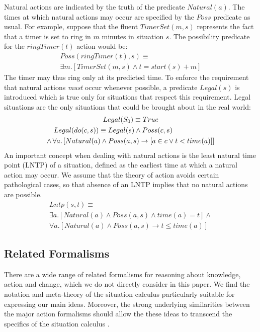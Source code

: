 Natural actions are indicated by the truth of the predicate $Natural(a)$.
The times at which natural actions may occur are specified by the
$Poss$ predicate as usual. For example, suppose that the fluent $TimerSet(m,s)$
represents the fact that a timer is set to ring in $m$ minutes in
situation $s$. The possibility predicate for the $ringTimer(t)$
action would be:\begin{multline*}
Poss(ringTimer(t),s)\equiv\\
\exists m.\left[TimerSet(m,s)\wedge t=start(s)+m\right]\end{multline*}
 The timer may thus ring only at its predicted time. To enforce the
requirement that natural actions \emph{must} occur whenever possible,
a predicate $Legal(s)$ is introduced which is true only for situations
that respect this requirement. Legal situations are the only situations
that could be brought about in the real world:\begin{multline*}
Legal(S_{0})\equiv True\\
\shoveleft{Legal(do(c,s))\equiv Legal(s)\wedge Poss(c,s)}\\
\wedge\,\forall a.\left[Natural(a)\wedge Poss(a,s)\rightarrow\left[a\in c\vee t<time(a)\right]\right]\end{multline*}
 An important concept when dealing with natural actions is the least
natural time point (LNTP) of a situation, defined as the earliest
time at which a natural action may occur. We assume that the theory
of action avoids certain pathological cases, so that absence of an
LNTP implies that no natural actions are possible.\begin{multline*}
Lntp(s,t)\equiv\\
\exists a.\left[Natural(a)\wedge Poss(a,s)\wedge time(a)=t\right]\wedge\\
\forall a.\left[Natural(a)\wedge Poss(a,s)\rightarrow t\leq time(a)\right]\end{multline*}



\subsection{Related Formalisms}

There are a wide range of related formalisms for reasoning about knowledge,
action and change, which we do not directly consider in this paper.
We find the notation and meta-theory of the situation calculus particularly
suitable for expressing our main ideas. Moreover, the strong underlying
similarities between the major action formalisms should allow the
these ideas to transcend the specifics of the situation calculus \cite{thielscher06reconcile_sc_fc,thielscher07unifying_action_calculus,vanbentham07ml_sitcalc}.


